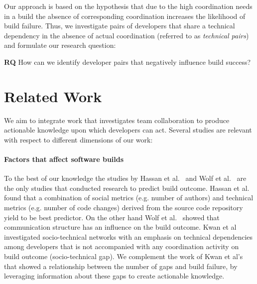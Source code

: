 \documentclass[conference]{IEEEtran}
\begin{document}

Our approach is based on the hypothesis that due to the high coordination needs in a build the absence of corresponding coordination increases the likelihood of build failure. 
Thus, we
investigate pairs of developers that share a technical dependency in the absence of actual coordination (referred to as \emph{technical pairs}) and formulate our research question:

\textbf{RQ} How can we identify developer pairs that negatively influence build success?
 

\section{Related Work}
\label{sec:relwork}
We aim to integrate work that investigates team collaboration to produce actionable knowledge upon which developers can act.
Several studies are relevant with respect to different dimensions of our work:

\paragraph{Factors that affect software builds}
To the best of our knowledge the studies by Hassan et al.~\cite{hassan:ase:2006}
and Wolf et al.~\cite{wolf:icse:2009} are the only studies that conducted
research to predict build outcome. Hassan et al.~\cite{hassan:ase:2006} found
that a combination of social metrics (e.g. number of authors) and technical
metrics (e.g. number of code changes) derived from the source code repository
yield to be best predictor. 
On the other hand Wolf et al.~\cite{wolf:icse:2009} showed that communication structure has an influence on the build outcome.
Kwan et al~\cite{kwan:tse:2011} investigated socio-technical networks with an emphasis on technical dependencies among developers that is not accompanied with any coordination activity on build outcome (socio-technical gap).
We complement the work of Kwan et al's ~\cite{kwan:tse:2011} that showed a relationship between the number of gaps and build failure, by leveraging information about these gaps to create actionable knowledge.
\end{document}
